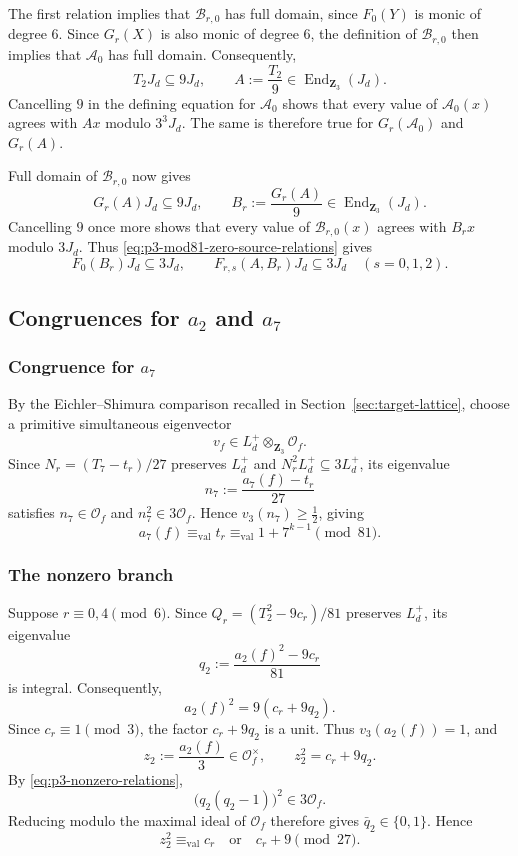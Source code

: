\documentclass[11pt]{article}
\newcommand{\End}{\operatorname{End}}
\theoremstyle{plain}
\theoremstyle{definition}
\theoremstyle{remark}
\numberwithin{equation}{section}
\begin{document}
The first relation implies that \(\mathcal B_{r,0}\) has full domain, since \(F_0(Y)\) is monic of degree \(6\). Since \(G_r(X)\) is also monic of degree \(6\), the definition of \(\mathcal B_{r,0}\) then implies that \(\mathcal A_0\) has full domain. Consequently, \[ T_2J_d\subseteq9J_d, \qquad A:=\frac{T_2}{9}\in\End_{\mathbf Z_3}(J_d). \] Cancelling \(9\) in the defining equation for \(\mathcal A_0\) shows that every value of \(\mathcal A_0(x)\) agrees with \(Ax\) modulo \(3^3J_d\). The same is therefore true for \(G_r(\mathcal A_0)\) and \(G_r(A)\).  

Full domain of \(\mathcal B_{r,0}\) now gives \[ G_r(A)J_d\subseteq9J_d, \qquad B_r:=\frac{G_r(A)}9 \in\End_{\mathbf Z_3}(J_d). \] Cancelling \(9\) once more shows that every value of \(\mathcal B_{r,0}(x)\) agrees with \(B_rx\) modulo \(3J_d\). Thus \eqref{eq:p3-mod81-zero-source-relations} gives \begin{equation} F_0(B_r)J_d\subseteq3J_d, \qquad F_{r,s}(A,B_r)J_d\subseteq3J_d \quad(s=0,1,2). \label{eq:p3-mod81-zero-target-relations} \end{equation}

\subsection{Congruences for \texorpdfstring{\(a_2\)}{a2} and \texorpdfstring{\(a_7\)}{a7}}  
\subsubsection{Congruence for \texorpdfstring{\(a_7\)}{a7}} By the Eichler--Shimura comparison recalled in Section~\ref{sec:target-lattice}, choose a primitive simultaneous eigenvector \[ v_f\in L_d^+\otimes_{\mathbf Z_3}\mathcal O_f. \] Since \(N_r=(T_7-t_r)/27\) preserves \(L_d^+\) and \(N_r^2L_d^+\subseteq3L_d^+\), its eigenvalue \[ n_7:=\frac{a_7(f)-t_r}{27} \] satisfies \(n_7\in\mathcal O_f\) and \(n_7^2\in3\mathcal O_f\). Hence \(v_3(n_7)\geq\tfrac12\), giving \begin{equation} a_7(f)\equiv_{\mathrm{val}}t_r \equiv_{\mathrm{val}}1+7^{k-1}\pmod{81}. \label{eq:p3-mod81-T7} \end{equation}

\subsubsection{The nonzero branch} Suppose \(r\equiv0,4\pmod6\). Since \(Q_r=(T_2^2-9c_r)/81\) preserves \(L_d^+\), its eigenvalue \[q_2:=\frac{a_2(f)^2-9c_r}{81} \] is integral. Consequently, \[ a_2(f)^2=9(c_r+9q_2). \] Since \(c_r\equiv1\pmod3\), the factor \(c_r+9q_2\) is a unit. Thus \(v_3(a_2(f))=1\), and \[ z_2:=\frac{a_2(f)}3\in\mathcal O_f^\times, \qquad z_2^2=c_r+9q_2. \] By \eqref{eq:p3-nonzero-relations}, \[ \bigl(q_2(q_2-1)\bigr)^2\in3\mathcal O_f. \] Reducing modulo the maximal ideal of \(\mathcal O_f\) therefore gives \(\bar q_2\in\{0,1\}\). Hence \[ z_2^2\equiv_{\mathrm{val}}c_r \quad\text{or}\quad c_r+9\pmod{27}. \]
\end{document}
